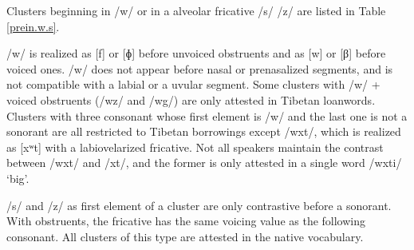 \documentclass[oldfontcommands,oneside,a4paper,11pt]{article}
\begin{document}
 Clusters beginning in /w/ or in a alveolar fricative /s/ /z/ are listed in Table \ref{prein.w.s}. 
 
 /w/ is realized as [f] or [ɸ] before unvoiced obstruents and as [w] or [β] before voiced ones. /w/ does not appear before nasal or prenasalized segments, and is not compatible with a labial or a uvular segment. Some clusters with /w/ + voiced obstruents (/wz/ and /wg/) are only attested in Tibetan loanwords. Clusters with three consonant whose first element is /w/ and the last one is not a sonorant are all restricted to Tibetan borrowings except /wxt/, which is realized as [xʷt] with a labiovelarized fricative. Not all speakers maintain the contrast between /wxt/ and /xt/, and the former is only attested in a single word /wxti/ `big'.
 
 /s/ and /z/ as first element of a cluster are only contrastive before a sonorant. With obstruents, the fricative has the same voicing value as the following consonant. All clusters of this type are attested in the native vocabulary.
 
\end{document}
